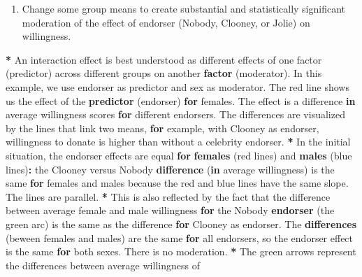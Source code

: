 \documentclass[a4paper]{book}
\newenvironment{Shaded}{\begin{snugshade}}{\end{snugshade}}
\newcommand{\KeywordTok}[1]{\textcolor[rgb]{0,0,0}{\textbf{#1}}}
\newcommand{\StringTok}[1]{\textcolor[rgb]{0.00,0.00,0.00}{#1}}
\newcommand{\ControlFlowTok}[1]{\textcolor[rgb]{0.00,0.00,0.00}{\textbf{#1}}}
\newcommand{\OperatorTok}[1]{\textcolor[rgb]{0.00,0.00,0.00}{\textbf{#1}}}
\newcommand{\NormalTok}[1]{#1}
\providecommand{\tightlist}{%
  \setlength{\itemsep}{0pt}\setlength{\parskip}{0pt}}
\theoremstyle{definition}
\theoremstyle{definition}
\theoremstyle{definition}
\theoremstyle{remark}
\begin{document}
\begin{enumerate}
\def\labelenumi{\arabic{enumi}.}
\setcounter{enumi}{1}
\tightlist
\item
  Change some group means to create substantial and statistically
  significant moderation of the effect of endorser (Nobody, Clooney, or
  Jolie) on willingness.
\end{enumerate}

\begin{Shaded}
\begin{Highlighting}[]
\OperatorTok{*}\StringTok{ }\NormalTok{An interaction effect is best understood as different effects of one factor}
\NormalTok{(predictor) across different groups on another }\KeywordTok{factor}\NormalTok{ (moderator). In this}
\NormalTok{example, we use endorser as predictor and sex as moderator. The red line shows}
\NormalTok{us the effect of the }\KeywordTok{predictor}\NormalTok{ (endorser) }\ControlFlowTok{for}\NormalTok{ females. The effect is a}
\NormalTok{difference }\ControlFlowTok{in}\NormalTok{ average willingness scores }\ControlFlowTok{for}\NormalTok{ different endorsers. The}
\NormalTok{differences are visualized by the lines that link two means, }\ControlFlowTok{for}\NormalTok{ example, with}
\NormalTok{Clooney as endorser, willingness to donate is higher than without a celebrity}
\NormalTok{endorser.}
\OperatorTok{*}\StringTok{ }\NormalTok{In the initial situation, the endorser effects are equal }\ControlFlowTok{for} \KeywordTok{females}\NormalTok{ (red}
\NormalTok{lines) and }\KeywordTok{males}\NormalTok{ (blue lines)}\OperatorTok{:}\StringTok{ }\NormalTok{the Clooney versus Nobody }\KeywordTok{difference}\NormalTok{ (}\ControlFlowTok{in}
\NormalTok{average willingness) is the same }\ControlFlowTok{for}\NormalTok{ females and males because the red and}
\NormalTok{blue lines have the same slope. The lines are parallel.}
\OperatorTok{*}\StringTok{ }\NormalTok{This is also reflected by the fact that the difference between average}
\NormalTok{female and male willingness }\ControlFlowTok{for}\NormalTok{ the Nobody }\KeywordTok{endorser}\NormalTok{ (the green arc) is the}
\NormalTok{same as the difference }\ControlFlowTok{for}\NormalTok{ Clooney as endorser. The }\KeywordTok{differences}\NormalTok{ (beween}
\NormalTok{females and males) are the same }\ControlFlowTok{for}\NormalTok{ all endorsers, so the endorser effect is}
\NormalTok{the same }\ControlFlowTok{for}\NormalTok{ both sexes. There is no moderation.}
\OperatorTok{*}\StringTok{ }\NormalTok{The green arrows represent the differences between average willingness of}

\end{Highlighting}
\end{Shaded}
\end{document}

